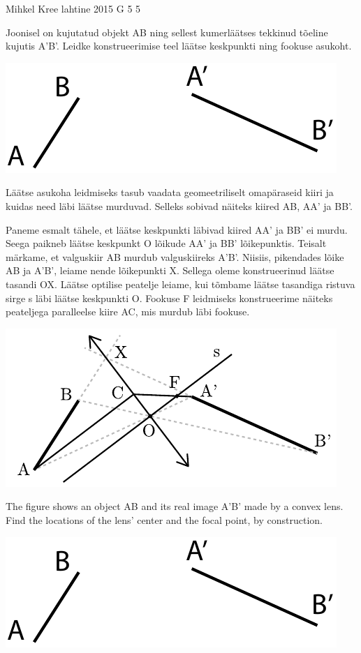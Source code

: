 {Mihkel Kree} %
{lahtine} %
{2015} %
{G 5} %
{5} %
{
\ifStatement
Joonisel on kujutatud objekt AB ning sellest kumerläätses tekkinud tõeline kujutis A'B'. Leidke konstrueerimise teel läätse keskpunkti ning fookuse asukoht.

\begin{center}
 \includegraphics[width=0.7\linewidth]{2015-lahg-05-laatsMihkel.pdf}
\end{center}
\fi


\ifHint
Läätse asukoha leidmiseks tasub vaadata geomeetriliselt omapäraseid kiiri ja kuidas need läbi läätse murduvad. Selleks sobivad näiteks kiired AB, AA' ja BB'.
\fi


\ifSolution
Paneme esmalt tähele, et läätse keskpunkti läbivad kiired AA' ja BB' ei murdu. Seega paikneb läätse keskpunkt O lõikude AA' ja BB' lõikepunktis. Teisalt märkame, et valguskiir AB murdub valguskiireks A'B'. Niisiis, pikendades lõike AB ja A'B', leiame nende lõikepunkti X. Sellega oleme konstrueerinud läätse tasandi OX. Läätse optilise peatelje leiame, kui tõmbame läätse tasandiga ristuva sirge s läbi läätse keskpunkti O. Fookuse F leidmiseks konstrueerime näiteks peateljega paralleelse kiire AC, mis murdub läbi fookuse.

\begin{center}
\includegraphics[width=\textwidth]{2015-lahg-05-laatsLahendus.pdf}
\end{center}
\fi


\ifEngStatement
The figure shows an object AB and its real image A’B’ made by a convex lens. Find the locations of the lens’ center and the focal point, by construction.
\begin{center}
 \includegraphics[width=0.7\linewidth]{2015-lahg-05-laatsMihkel}
\end{center}
\fi


}
